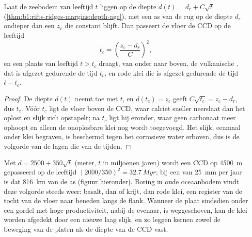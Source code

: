 \begin{proposition}\label{prop:b1:chemical-biogenic-sediments:flank}
Laat de zeebodem van leeftijd $t$ liggen op de diepte $d(t) = d_r + C\sqrt t$
(\cref{thm:b1:rifts-ridges-margins:depth-age}), met een as van de rug op de diepte $d_r$
ondieper dan een  $z_c$ die constant blijft. Dan passeert de vloer de CCD op de leeftijd
\[
t_c = \left(\frac{z_c - d_r}{C}\right)^2 ,
\]
en een plaats van leeftijd $t > t_c$ draagt, van onder naar boven, de vulkanische ,  dat is afgezet gedurende de tijd $t_c$, en rode klei die is afgezet gedurende de tijd $t - t_c$.
\end{proposition}

\begin{proof}
De diepte $d(t)$ neemt toe met $t$, en $d(t_c) = z_c$ geeft $C\sqrt{t_c} =
z_c - d_r$, dus $t_c$. Vóór $t_c$ ligt de vloer boven de CCD, waar calciet
sneller neerslaat dan het oplost en slijk zich opstapelt; na $t_c$ ligt hij
eronder, waar geen carbonaat meer ophoopt en alleen de onoplosbare klei nog wordt
toegevoegd. Het slijk, eenmaal onder klei begraven, is beschermd tegen het corrosieve water
erboven, dus is de volgorde van de lagen die van de tijden.
\end{proof}

Met $d = 2500 + 350\sqrt t$ (meter, $t$ in miljoenen jaren) wordt een CCD op \qty{4500}{m} gepasseerd op de leeftijd $(2000/350)^2 = \qty{32.7}{Myr}$; bij een  van \qty{25}{mm} per jaar is dat \qty{816}{km} van de as (figuur hieronder). Boring in oude oceaanbodem vindt deze volgorde steeds weer: basalt, dan  of krijt, dan rode klei, een register van de tocht van de vloer naar beneden langs de flank. Wanneer de plaat sindsdien onder een gordel met hoge productiviteit, nabij de evenaar, is weggeschoven, kan de klei worden afgedekt door een nieuwe laag slijk, en zo leggen kernen zowel de beweging van de platen als de diepte van de CCD vast.

